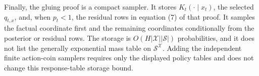 Finally, the gluing proof is a compact sampler.  It stores \(K_t(\cdot\mid x_t)\), the selected \(q_{t,x}\), and, when \(p_t<1\), the residual rows in equation (7) of that proof.  It samples the factual coordinate first and the remaining coordinates conditionally from the posterior or residual rows.  The storage is \(O(H|\mathcal X||\mathcal S|)\) probabilities, and it does not list the generally exponential mass table on \(\mathcal S^{\mathcal X}\).  Adding the independent finite action-coin samplers requires only the displayed policy tables and does not change this response-table storage bound.